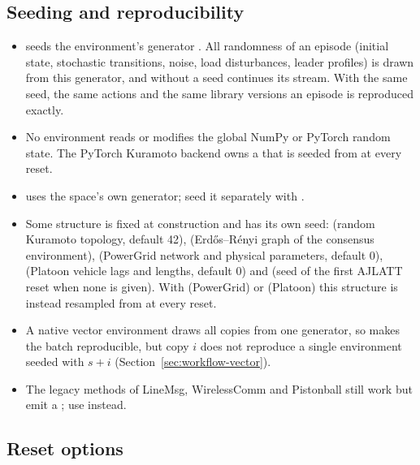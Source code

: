 \subsection{Seeding and reproducibility}\label{sec:envlib-seeding}

\begin{itemize}
  \item {} seeds the environment's generator
        . All randomness of an episode (initial state,
        stochastic transitions, noise, load disturbances, leader profiles)
        is drawn from this generator, and  without a seed
        continues its stream. With the same seed, the same actions and the
        same library versions an episode is reproduced exactly.
  \item No environment reads or modifies the global NumPy or PyTorch random
        state. The PyTorch Kuramoto backend owns a  that
        is seeded from  at every reset.
  \item {} uses the space's own generator; seed
        it separately with .
  \item Some structure is fixed at construction and has its own seed:
         (random Kuramoto topology, default 42),
         (Erd\H{o}s--R\'enyi graph of the consensus
        environment),  (PowerGrid network and physical
        parameters, default 0),  (Platoon vehicle lags and
        lengths, default 0) and  (seed of the first
        AJLATT reset when none is given). With 
        (PowerGrid) or  (Platoon) this
        structure is instead resampled from  at every
        reset.
  \item A native vector environment draws all copies from one generator, so
         makes the batch reproducible, but copy $i$ does
        not reproduce a single environment seeded with $s + i$
        (Section~\ref{sec:workflow-vector}).
  \item The legacy  methods of LineMsg, WirelessComm and
        Pistonball still work but emit a ; use
         instead.
\end{itemize}

\subsection{Reset options}\label{sec:envlib-reset-options}


